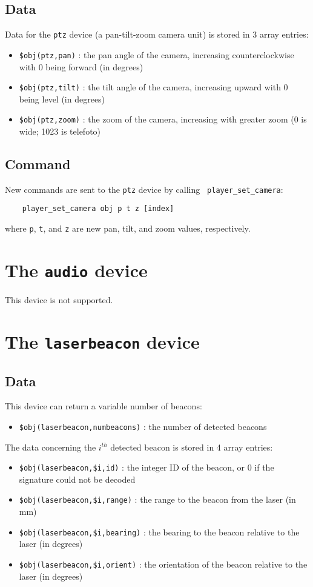 \documentclass[11pt]{article}
\begin{document}
\subsection{Data}
Data for the {\tt ptz} device (a pan-tilt-zoom camera unit) is stored in 
3 array entries:
\begin{itemize}
\item {\tt \$obj(ptz,pan)} : the pan angle of the camera, increasing
counterclockwise with 0 being forward (in degrees)
\item {\tt \$obj(ptz,tilt)} : the tilt angle of the camera, increasing upward
with 0 being level (in degrees)
\item {\tt \$obj(ptz,zoom)} : the zoom of the camera, increasing with greater
zoom (0 is wide; 1023 is telefoto)
\end{itemize}

\subsection{Command}
New commands are sent to the {\tt ptz} device by calling {\tt
player\_set\_camera}:
\begin{verbatim}
    player_set_camera obj p t z [index]
\end{verbatim}
where {\tt p}, {\tt t}, and {\tt z} are new pan, tilt, and zoom values,
respectively.

\section{The {\tt audio} device}
This device is not supported.

\section{The {\tt laserbeacon} device}
\subsection{Data}
This device can return a variable number of beacons:
\begin{itemize}
\item {\tt \$obj(laserbeacon,numbeacons)} : the number of detected beacons
\end{itemize}
The data concerning the $i^{th}$ detected beacon is stored in 4 array entries:
\begin{itemize}
\item {\tt \$obj(laserbeacon,\$i,id)} : the integer ID of the beacon, or 0 if 
the signature could not be decoded
\item {\tt \$obj(laserbeacon,\$i,range)} : the range to the beacon from the
laser (in mm)
\item {\tt \$obj(laserbeacon,\$i,bearing)} : the bearing to the beacon
relative to the laser (in degrees)
\item {\tt \$obj(laserbeacon,\$i,orient)} : the orientation of the beacon
relative to the laser (in degrees)
\end{itemize}
\end{document}
